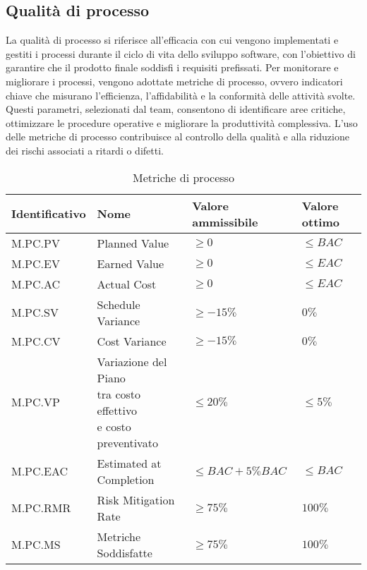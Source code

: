 \subsection{Qualità di processo}
\label{subsec:obiettivi_processo}
La qualità di processo si riferisce all'efficacia con cui vengono implementati e gestiti i processi durante il ciclo di vita dello sviluppo software, 
con l'obiettivo di garantire che il prodotto finale soddisfi i requisiti prefissati. 
Per monitorare e migliorare i processi, vengono adottate metriche di processo, ovvero indicatori chiave che misurano l'efficienza, l'affidabilità 
e la conformità delle attività svolte. 
Questi parametri, selezionati dal team, consentono di identificare aree critiche, ottimizzare le procedure operative e migliorare la produttività complessiva. 
L'uso delle metriche di processo contribuisce al controllo della qualità e alla riduzione dei rischi associati a ritardi o difetti.


\begin{table}[H]
    \centering
    \begin{tabular}{| l | l | l | l |}
    \hline
    \textbf{Identificativo} & 
    \textbf{Nome} &
    \textbf{Valore ammissibile} &
    \textbf{Valore ottimo}\\
    \hline
        M.PC.PV & Planned Value & $\geq 0$ & $\leq BAC$ \\
    \hline
        M.PC.EV & Earned Value & $\geq 0$ & $\leq EAC$ \\
    \hline
        M.PC.AC & Actual Cost & $\geq 0$ & $\leq EAC$ \\
    \hline
        M.PC.SV & Schedule Variance & $\geq -15\%$ & $0\%$ \\
    \hline
        M.PC.CV & Cost Variance & $\geq -15\%$ & $0\%$ \\
    \hline  
        M.PC.VP & \makecell{Variazione del Piano \\ tra costo effettivo \\ e costo preventivato} & $\leq 20\%$ & $\leq 5\%$ \\
    \hline
        M.PC.EAC & Estimated at Completion & $\leq BAC+5\% BAC$ & $\leq BAC$ \\
    \hline
        M.PC.RMR & Risk Mitigation Rate & $\geq 75\%$ & $100\%$ \\
    \hline
        M.PC.MS & Metriche Soddisfatte & $\geq 75\%$ & $100\%$ \\
    \hline
    \end{tabular}
    \caption{Metriche di processo}
    \label{tab:metriche_processo} 
\end{table}